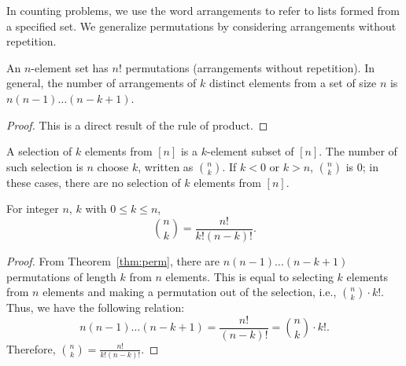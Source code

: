 \documentclass[../main.tex]{subfiles}
\begin{document}
In counting problems, we use the word \textsf{arrangements} to refer to lists formed from a specified set.
We generalize permutations by considering arrangements without repetition.

\begin{thm} \label{thm:perm}
    An $n$-element set has $n!$ permutations (arrangements without repetition).
    In general, the number of arrangements of $k$ distinct elements from a set of size $n$ is $n(n -1) \dots (n - k + 1)$.
\end{thm}
\begin{proof}
    This is a direct result of the rule of product.
\end{proof}

\begin{defn}
    A \textsf{selection} of $k$ elements from $[n]$ is a $k$-element subset of $[n]$.
    The number of such selection is $n$ \textsf{choose} $k$, written as $n \choose k$.
    If $k < 0$ or $k > n$, $n \choose k$ is 0; in these cases, there are no selection of $k$ elements from $[n]$.
\end{defn}

\begin{thm} \label{thm:comb}
    For integer $n$, $k$ with $0 \leq k \leq n$,
    \[
        {n \choose k} = \frac{n!}{k! (n - k)!}.
    \]
\end{thm}
\begin{proof}
    From Theorem~\ref{thm:perm}, there are $n(n-1) \dots (n-k+1)$ permutations of length $k$ from $n$ elements.
    This is equal to selecting $k$ elements from $n$ elements and making a permutation out of the selection, i.e., ${n \choose k} \cdot k!$.
    Thus, we have the following relation:
    \[
        n(n-1) \dots (n-k+1) = \frac{n!}{(n-k)!} = {n \choose k} \cdot k!.
    \]
    Therefore, ${n \choose k} = \frac{n!}{k! (n-k)!}$.
\end{proof}
\end{document}
